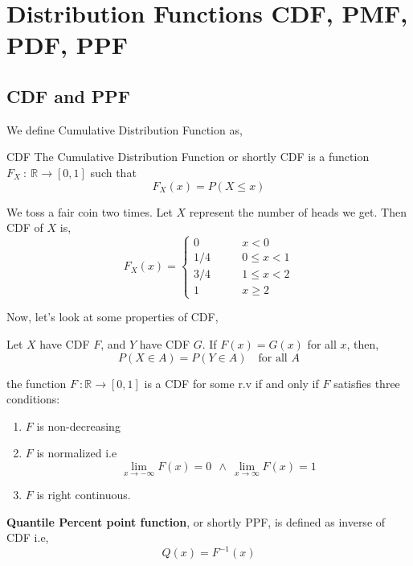 \section{Distribution Functions CDF, PMF, PDF, PPF}
\subsection*{CDF and PPF}
We define  \alert{Cumulative Distribution Function} as,

\begin{definition}{CDF}
    The \alert{Cumulative Distribution Function} or shortly \alert{CDF} is a function $F_X \ : \ \mathbb{R} \rightarrow [0,1]$ such that
    \[ F_X(x) = P( X \le x) \]
\end{definition}

\begin{example}
    We toss a fair coin two times. Let $X$ represent the number of heads we get. Then CDF of $X$ is,
    \[F_X(x) =
        \begin{cases}
            0 \qquad &x < 0\\
            1/4 \qquad &0 \le x <1 \\
            3/4 \qquad &1 \leq x < 2 \\
            1 \qquad &x \ge 2
        \end{cases}
    \]
\end{example}

Now, let's look at some properties of CDF,
\begin{theorem}
    Let $X$ have CDF $F$, and $Y$  have CDF $G$. If $F(x)=G(x)$ for all $x$, then,
    \[ P(X \in A) = P(Y \in A) \quad \text{for all $A$} \]
\end{theorem}

\begin{theorem}
    the function $F \ : \mathbb{R} \rightarrow [0,1]$ is a CDF for some r.v if and only if $F$ satisfies three conditions:
    \begin{enumerate}
        \item $F$ is non-decreasing
        \item $F$ is normalized i.e \[ \lim_{x \rightarrow -\infty} F(x) = 0\ \ \land \ \lim_{x \rightarrow \infty} F(x) =1 \]
        \item $F$ is right continuous.
    \end{enumerate}
\end{theorem}
\begin{definition}
    \textbf{Quantile Percent point function}, or shortly \alert{PPF}, is defined as inverse of CDF i.e,
    \[Q(x) = F^{-1}(x)\]
\end{definition}

